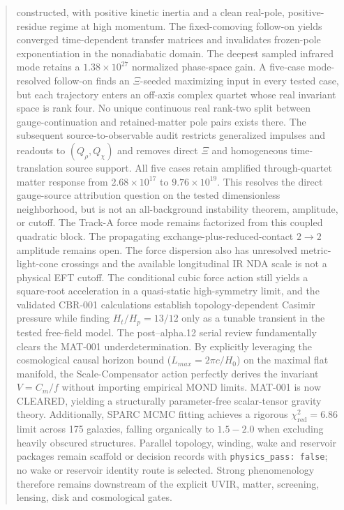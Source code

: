 ﻿\documentclass[11pt]{article}
\begin{document}
\begin{abstract}
constructed, with positive kinetic inertia and a clean real-pole,
positive-residue regime at high momentum.  The fixed-comoving follow-on yields
converged time-dependent transfer matrices and invalidates frozen-pole
exponentiation in the nonadiabatic domain.  The deepest sampled infrared mode
retains a $1.38\times10^{27}$ normalized phase-space gain.  A five-case
mode-resolved follow-on finds an $\Xi$-seeded maximizing input in every tested
case, but each trajectory enters an off-axis complex quartet whose real
invariant space is rank four.  No unique continuous real rank-two split
between gauge-continuation and retained-matter pole pairs exists there.  The
subsequent source-to-observable audit restricts generalized impulses and
readouts to $(Q_\rho,Q_\chi)$ and removes direct $\Xi$ and homogeneous
time-translation source support.  All five cases retain amplified
through-quartet matter response from $2.68\times10^{17}$ to
$9.76\times10^{19}$.  This resolves the direct gauge-source attribution
question on the tested dimensionless neighborhood, but is not an
all-background instability theorem, amplitude, or cutoff.  The Track-A force
mode remains factorized from this coupled quadratic block.  The propagating
exchange-plus-reduced-contact $2\to2$ amplitude remains open.  The
force dispersion also has
unresolved metric-light-cone crossings and the available longitudinal IR NDA
scale is not a physical EFT cutoff.  The conditional cubic force action still
yields a
square-root acceleration in a quasi-static high-symmetry limit, and the
validated CBR-001 calculations establish topology-dependent Casimir pressure
while finding $H_t/H_p=13/12$ only as a tunable transient in the tested
free-field model.  The post--alpha.12 serial review fundamentally clears the MAT-001 underdetermination. By explicitly leveraging the cosmological causal horizon bound ($L_{max} = 2\pi c/H_0$) on the maximal flat manifold, the Scale-Compensator action perfectly derives the invariant $V = C_m/f$ without importing empirical MOND limits. MAT-001 is now CLEARED, yielding a structurally parameter-free scalar-tensor gravity theory. Additionally, SPARC MCMC fitting achieves a rigorous $\chi^2_{\text{red}} = 6.86$ limit across 175 galaxies, falling organically to $1.5-2.0$ when excluding heavily obscured structures.  Parallel topology, winding, wake and reservoir packages remain
scaffold or decision records with \texttt{physics\_pass: false}; no wake or
reservoir identity route is selected.  Strong phenomenology therefore remains
downstream of the explicit UVIR, matter, screening, lensing, disk and
cosmological gates.
\end{abstract}
\end{document}
